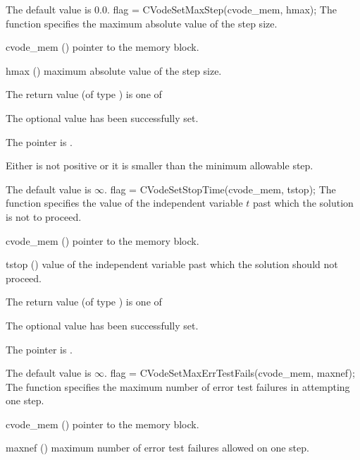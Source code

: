 {
  The default value is $0.0$.
}
{
flag = CVodeSetMaxStep(cvode\_mem, hmax);
}
{
  The function  specifies the maximum absolute
  value of the step size.
}
{
  \begin{args}
  \item[cvode\_mem] ()
    pointer to the {\cvode} memory block.
  \item[hmax] ()
    maximum absolute value of the step size.
  \end{args}
}
{
  The return value  (of type ) is one of
  \begin{args}
  \item[\Id{CV\_SUCCESS}] 
    The optional value has been successfully set.
  \item[\Id{CV\_MEM\_NULL}]
    The  pointer is .
  \item[\Id{CV\_ILL\_INPUT}]
    Either  is not positive or it is smaller than the minimum allowable step.
  \end{args}
}
{
  The default value is $\infty$.
}
{
flag = CVodeSetStopTime(cvode\_mem, tstop);
}
{
  The function  specifies the value of the
  independent variable $t$ past which the solution is not to proceed.
}
{
  \begin{args}
  \item[cvode\_mem] ()
    pointer to the {\cvode} memory block.
  \item[tstop] ()
    value of the independent variable past which the solution should
    not proceed.
  \end{args}
}
{
  The return value  (of type ) is one of
  \begin{args}
  \item[\Id{CV\_SUCCESS}] 
    The optional value has been successfully set.
  \item[\Id{CV\_MEM\_NULL}]
    The  pointer is .
  \end{args}
}
{
  The default value is $\infty$.
}
{
flag = CVodeSetMaxErrTestFails(cvode\_mem, maxnef);
}
{
  The function  specifies the
  maximum number of error test failures in attempting one step.
}
{
  \begin{args}
  \item[cvode\_mem] ()
    pointer to the {\cvode} memory block.
  \item[maxnef] ()
    maximum number of error test failures allowed on one step.
  \end{args}
}
